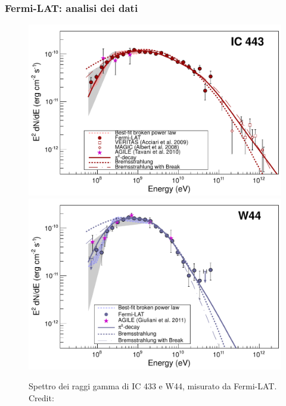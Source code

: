 \documentclass[10pt]{beamer}
\begin{document}
\begin{frame}
  \frametitle{Fermi-LAT: analisi dei dati}
  \begin{figure}
    \centering
    \includegraphics[width=0.5\columnwidth]{1231160fig2a}
    \includegraphics[width=0.5\columnwidth]{1231160fig2b}
    \caption{Spettro dei raggi gamma di IC 433 e W44, misurato da Fermi-LAT.
      Credit: \textcite{2013Sci...339..807A}}
  \end{figure}
\end{frame}
\end{document}
